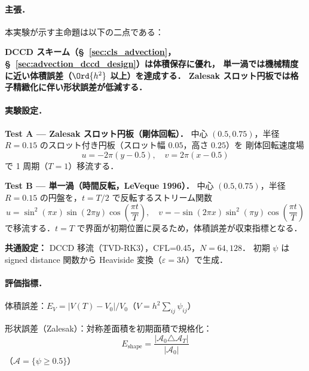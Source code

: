 %

\paragraph{主張．}

本実験が示す主命題は以下の二点である：

\begin{center}
\textbf{%
  DCCD スキーム（§~\ref{sec:cls_advection}，§~\ref{sec:advection_dccd_design}）は体積保存に優れ，%
  単一渦では機械精度に近い体積誤差（$\Ord{h^2}$ 以上）を達成する．%
  Zalesak スロット円板では格子精緻化に伴い形状誤差が低減する．}
\end{center}

\paragraph{実験設定．}

\textbf{Test A — Zalesak スロット円板（剛体回転）．}
中心 $(0.5,0.75)$，半径 $R=0.15$ のスロット付き円板（スロット幅 $0.05$，高さ $0.25$）を
剛体回転速度場
\begin{equation}
  u = -2\pi(y - 0.5), \quad v = 2\pi(x - 0.5)
  \label{eq:solid_body_vel}
\end{equation}
で 1 周期（$T=1$）移流する．

\textbf{Test B — 単一渦（時間反転，LeVeque 1996）．}
中心 $(0.5,0.75)$，半径 $R=0.15$ の円盤を，$t = T/2$ で反転するストリーム関数
\begin{equation}
  u = \sin^2(\pi x)\sin(2\pi y)\cos\!\left(\frac{\pi t}{T}\right), \quad
  v = -\sin(2\pi x)\sin^2(\pi y)\cos\!\left(\frac{\pi t}{T}\right)
  \label{eq:single_vortex_vel}
\end{equation}
で移流する．$t=T$ で界面が初期位置に戻るため，体積誤差が収束指標となる．

\textbf{共通設定：} DCCD 移流（TVD-RK3），CFL=0.45，$N=64,128$．
初期 $\psi$ は signed distance 関数から Heaviside 変換（$\varepsilon = 3h$）で生成．

\paragraph{評価指標．}

体積誤差：$E_V = |V(T) - V_0| / V_0$（$V = h^2 \sum_{ij} \psi_{ij}$）

形状誤差（Zalesak）：対称差面積を初期面積で規格化：
\begin{equation}
  E_\text{shape} = \frac{|\mathcal{A}_0 \triangle \mathcal{A}_T|}{|\mathcal{A}_0|}
  \label{eq:shape_err}
\end{equation}
（$\mathcal{A} = \{\psi \geq 0.5\}$）

